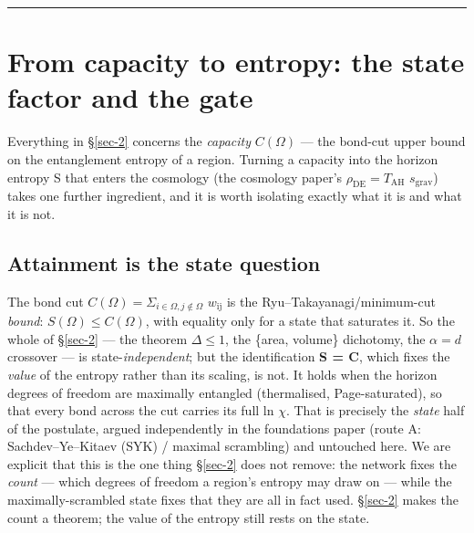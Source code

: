 \documentclass[aps,prd,preprint,nofootinbib,superscriptaddress]{revtex4-2}
\begin{document}
\begin{center}\rule{0.5\linewidth}{0.5pt}\end{center}

\section{From capacity to entropy: the state factor and the
gate}\label{sec-6}

Everything in §\ref{sec-2} concerns the \emph{capacity} \(C(\Omega )\)
--- the bond-cut upper bound on the entanglement entropy of a region.
Turning a capacity into the horizon entropy S that enters the cosmology
(the cosmology paper's \(\rho _\mathrm{DE} = T_\mathrm{AH}\)
\(s_{\mathrm{grav}}\)) takes one further ingredient, and it is worth
isolating exactly what it is and what it is not.

\subsection{Attainment is the state question}\label{sec-6-1}

The bond cut \(C(\Omega ) = \Sigma _{i\in \Omega , j\notin \Omega }\)
\(w_{\mathrm{ij}}\) is the Ryu--Takayanagi/minimum-cut \emph{bound}:
\(S(\Omega ) \leq  C(\Omega )\), with equality only for a state that
saturates it. So the whole of §\ref{sec-2} --- the theorem
\(\Delta  \leq  1\), the \{area, volume\} dichotomy, the \(\alpha  = d\)
crossover --- is state-\emph{independent}; but the identification
\textbf{S = C}, which fixes the \emph{value} of the entropy rather than
its scaling, is not. It holds when the horizon degrees of freedom are
maximally entangled (thermalised, Page-saturated), so that every bond
across the cut carries its full ln \(\chi\). That is precisely the
\emph{state} half of the postulate, argued independently in the
foundations paper (route A: Sachdev--Ye--Kitaev (SYK) / maximal
scrambling) and untouched here. We are explicit that this is the one
thing §\ref{sec-2} does not remove: the network fixes the \emph{count}
--- which degrees of freedom a region's entropy may draw on --- while
the maximally-scrambled state fixes that they are all in fact used.
§\ref{sec-2} makes the count a theorem; the value of the entropy still
rests on the state.
\end{document}

